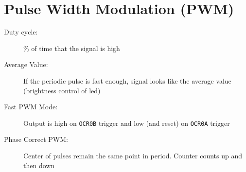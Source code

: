 \section{Pulse Width Modulation (PWM)}
\begin{description}
	\item[Duty cycle:] \% of time that the signal is high
	\item[Average Value:] If the periodic pulse is fast enough, signal looks like the average value (brightness control of led)
	\item[Fast PWM Mode:] Output is high on \texttt{OCR0B} trigger and low (and reset) on \texttt{OCR0A} trigger
	\item[Phase Correct PWM:] Center of pulses remain the same point in period. Counter counts up and then down
\end{description}